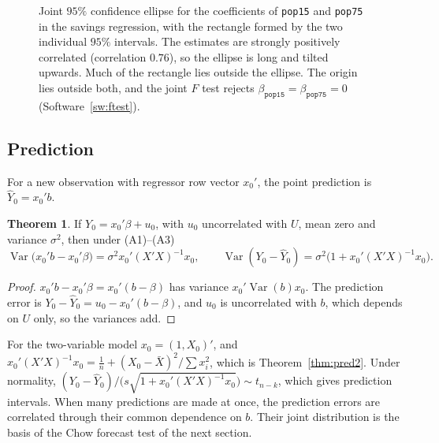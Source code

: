 \documentclass[11pt,a4paper]{article}
\numberwithin{equation}{section}
\DeclareMathOperator{\Var}{Var}
\theoremstyle{definition}
\newtheorem{thm}{Theorem}[subsection]
\begin{document}
\begin{figure}[H]
\caption{Joint $95\%$ confidence ellipse for the coefficients of \texttt{pop15} and \texttt{pop75} in the savings regression, with the rectangle formed by
the two individual $95\%$ intervals. The estimates are strongly positively correlated (correlation $0.76$), so the ellipse is long and tilted upwards.
Much of the rectangle lies outside the ellipse. The origin lies outside both, and the joint $F$ test rejects
$\beta_{\texttt{pop15}} = \beta_{\texttt{pop75}} = 0$ (Software~\ref{sw:ftest}).}
\label{fig:ellipse}
\end{figure}

\subsection{Prediction}
\label{ssec:predk}

For a new observation with regressor row vector $x_0'$, the point prediction is $\hat Y_0 = x_0'b$.

\begin{thm}
\label{thm:predk}
If $Y_0 = x_0'\beta + u_0$, with $u_0$ uncorrelated with $U$, mean zero and variance $\sigma^2$, then under (A1)--(A3)
\[
\Var\bigl(x_0'b - x_0'\beta\bigr) = \sigma^2x_0'(X'X)^{-1}x_0, \qquad \Var(Y_0 - \hat Y_0) = \sigma^2\bigl(1 + x_0'(X'X)^{-1}x_0\bigr) .
\]
\end{thm}

\begin{proof}
$x_0'b - x_0'\beta = x_0'(b - \beta)$ has variance $x_0'\Var(b)x_0$. The prediction error is $Y_0 - \hat Y_0 = u_0 - x_0'(b - \beta)$, and $u_0$ is uncorrelated with $b$,
which depends on $U$ only, so the variances add.
\end{proof}

For the two-variable model $x_0 = (1, X_0)'$, and $x_0'(X'X)^{-1}x_0 = \frac1n + (X_0 - \bar X)^2/\sum x_i^2$, which is Theorem~\ref{thm:pred2}. Under normality,
$(Y_0 - \hat Y_0)\big/\bigl(s\sqrt{1 + x_0'(X'X)^{-1}x_0}\bigr) \sim t_{n-k}$, which gives prediction intervals. When many predictions are made at once, the
prediction errors are correlated through their common dependence on $b$. Their joint distribution is the basis of the Chow forecast test of the next
section.
\end{document}
